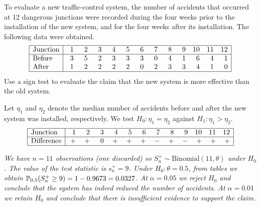 \begin{example}
To evaluate a new traffic-control system, the number of accidents that occurred at 12 dangerous junctions were recorded during the four weeks prior to the installation of the new system, and for the four weeks after its installation. The following data were obtained.
\small
\[\begin{array}{|l|rrrrrrrrrrrr|} \hline
\text{Junction}	& \phantom{1}1 & \phantom{1}2 & \phantom{1}3 & \phantom{1}4 & \phantom{1}5 & \phantom{1}6 & \phantom{1}7 & \phantom{1}8 & \phantom{1}9 & 10 & 11 & 12 \\ \hline
\text{Before}	& 3 & 5 & 2 & 3 & 3 & 3 & 0 & 4 & 1 &  6 &  4 &  1 \\
\text{After}	& 1 & 2 & 2 & 2 & 2 & 0 & 2 & 3 & 3 &  4 &  1 &  0 \\ \hline
\end{array}\]
\normalsize
Use a sign test to evaluate the claim that the new system is more effective than the old system.
\end{example}

\begin{solution}
Let $\eta_1$ and $\eta_2$ denote the median number of accidents before and after the new system was installed, respectively. We test $H_0:\eta_1=\eta_2$ against $H_1:\eta_1 > \eta_2$.
\[\begin{array}{|l|rrrrrrrrrrrr|} \hline
\text{Junction}	& \phantom{1}1 & \phantom{1}2 & \phantom{1}3 & \phantom{1}4 & \phantom{1}5 & \phantom{1}6 & \phantom{1}7 & \phantom{1}8 & \phantom{1}9 & 10 & 11 & 12 \\ \hline
\text{Difference}	& + & + & 0 & + & + & + & - & + & - &  + &  + &  + \\ \hline
\end{array}\]

\bit
\it We have $n=11$ observations (one discarded) so $S^{+}_n\sim\text{Binomial}(11,\theta)$ under $H_0$.
\it The value of the test statistic is $s^{+}_n = 9$.
\it Under $H_0:\theta=0.5$, from tables we obtain $\mathbb{P}_{0.5}(S^{+}_n\geq 9) = 1 - 0.9673 = 0.0327$.
\it At $\alpha=0.05$ we reject $H_0$ and conclude that the system has indeed reduced the number of accidents.
\it At $\alpha=0.01$ we retain $H_0$ and conclude that there is insufficient evidence to support the claim.
\eit
\end{solution}

